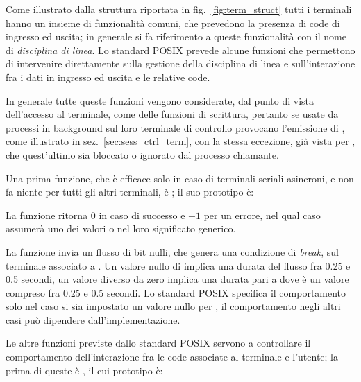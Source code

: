 Come illustrato dalla struttura riportata in fig.~\ref{fig:term_struct} tutti
i terminali hanno un insieme di funzionalità comuni, che prevedono la presenza
di code di ingresso ed uscita; in generale si fa riferimento a queste
funzionalità con il nome di \textsl{disciplina di
  linea}. Lo standard POSIX prevede alcune funzioni
che permettono di intervenire direttamente sulla gestione della disciplina di
linea e sull'interazione fra i dati in ingresso ed uscita e le relative code.

In generale tutte queste funzioni vengono considerate, dal punto di vista
dell'accesso al terminale, come delle funzioni di scrittura, pertanto se usate
da processi in background sul loro terminale di controllo provocano
l'emissione di , come illustrato in
sez.~\ref{sec:sess_ctrl_term}, con la stessa eccezione, già vista per
, che quest'ultimo sia bloccato o ignorato dal processo
chiamante.

Una prima funzione, che è efficace solo in caso di terminali seriali
asincroni, e non fa niente per tutti gli altri terminali, è
; il suo prototipo è:

\begin{funcproto}{

}

{La funzione ritorna $0$ in caso di successo e $-1$ per un errore, nel qual
  caso  assumerà uno dei valori  o 
  nel loro significato generico.}
\end{funcproto}

La funzione invia un flusso di bit nulli, che genera una condizione di
\textit{break}, sul terminale associato a . Un valore nullo
di  implica una durata del flusso fra 0.25 e 0.5 secondi, un
valore diverso da zero implica una durata pari a  dove
 è un valore compreso fra 0.25 e 0.5 secondi. Lo standard POSIX
specifica il comportamento solo nel caso si sia impostato un valore nullo
per , il comportamento negli altri casi può dipendere
dall'implementazione.

Le altre funzioni previste dallo standard POSIX servono a controllare il
comportamento dell'interazione fra le code associate al terminale e l'utente;
la prima di queste è , il cui prototipo è:


